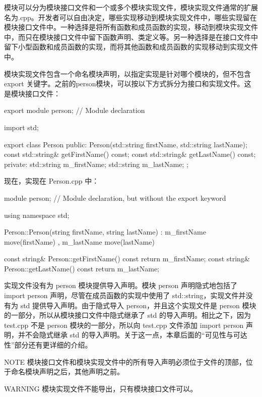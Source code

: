 模块可以分为模块接口文件和一个或多个模块实现文件，模块实现文件通常的扩展名为.cpp。开发者可以自由决定，哪些实现移动到模块实现文件中，哪些实现留在模块接口文件中。一种选择是将所有函数和成员函数的实现，移动到模块实现文件中，而只在模块接口文件中留下函数声明、类定义等。另一种选择是在接口文件中留下小型函数和成员函数的实现，而将其他函数和成员函数的实现移动到实现文件中。

模块实现文件包含一个命名模块声明，以指定实现是针对哪个模块的，但不包含 export 关键字。之前的person模块，可以按以下方式拆分为接口和实现文件。这是模块接口文件：

\begin{cpp}
export module person; // Module declaration

import std;

export class Person
{
    public:
        Person(std::string firstName, std::string lastName);
        const std::string& getFirstName() const;
        const std::string& getLastName() const;
    private:
        std::string m_firstName;
        std::string m_lastName;
};
\end{cpp}

现在，实现在 Person.cpp 中：

\begin{cpp}
module person; // Module declaration, but without the export keyword

using namespace std;

Person::Person(string firstName, string lastName)
: m_firstName { move(firstName) }, m_lastName { move(lastName) }
{}

const string& Person::getFirstName() const { return m_firstName; }
const string& Person::getLastName() const { return m_lastName; }
\end{cpp}

实现文件没有为 person 模块提供导入声明。模块 person 声明隐式地包括了 import person 声明，尽管在成员函数的实现中使用了 std::string，实现文件并没有为 std 提供导入声明。由于隐式导入 person，并且这个实现文件是 person 模块的一部分，所以从模块接口文件中隐式继承了 std 的导入声明。相比之下，因为 test.cpp 不是 person 模块的一部分，所以向 test.cpp 文件添加 import person 声明，并不会隐式继承 std 的导入声明。关于这一点，本章后面的“可见性与可达性”部分还有更详细的介绍。

\begin{myNotic}{NOTE}
模块接口文件和模块实现文件中的所有导入声明必须位于文件的顶部，位于命名模块声明之后，其他声明之前。
\end{myNotic}

\begin{myWarning}{WARNING}
模块实现文件不能导出，只有模块接口文件可以。
\end{myWarning}

